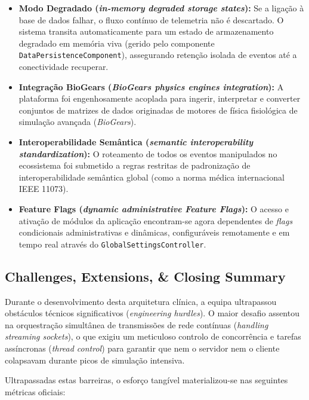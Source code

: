 \documentclass[11pt,a4paper]{article}
\begin{document}
\begin{itemize}[label=\color{accentblue}\bullet]
    \item \textbf{Modo Degradado (\textit{in-memory degraded storage states}):} Se a ligação à base de dados falhar, o fluxo contínuo de telemetria não é descartado. O sistema transita automaticamente para um estado de armazenamento degradado em memória viva (gerido pelo componente \texttt{DataPersistenceComponent}), assegurando retenção isolada de eventos até a conectividade recuperar.
    \item \textbf{Integração BioGears (\textit{BioGears physics engines integration}):} A plataforma foi engenhosamente acoplada para ingerir, interpretar e converter conjuntos de matrizes de dados originadas de motores de física fisiológica de simulação avançada (\textit{BioGears}).
    \item \textbf{Interoperabilidade Semântica (\textit{semantic interoperability standardization}):} O roteamento de todos os eventos manipulados no ecossistema foi submetido a regras restritas de padronização de interoperabilidade semântica global (como a norma médica internacional IEEE 11073).
    \item \textbf{Feature Flags (\textit{dynamic administrative Feature Flags}):} O acesso e ativação de módulos da aplicação encontram-se agora dependentes de \textit{flags} condicionais administrativas e dinâmicas, configuráveis remotamente e em tempo real através do \texttt{GlobalSettingsController}.
\end{itemize}

\subsection{Challenges, Extensions, \& Closing Summary}
Durante o desenvolvimento desta arquitetura clínica, a equipa ultrapassou obstáculos técnicos significativos (\textit{engineering hurdles}). O maior desafio assentou na orquestração simultânea de transmissões de rede contínuas (\textit{handling streaming sockets}), o que exigiu um meticuloso controlo de concorrência e tarefas assíncronas (\textit{thread control}) para garantir que nem o servidor nem o cliente colapsavam durante picos de simulação intensiva.

Ultrapassadas estas barreiras, o esforço tangível materializou-se nas seguintes métricas oficiais:
\end{document}
